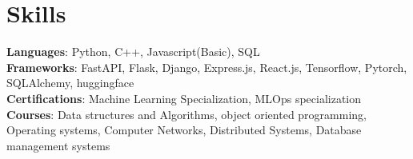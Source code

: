 \documentclass[letterpaper,11pt]{article}
\begin{document}
\section{Skills}
 \begin{itemize}[leftmargin=0.15in, label={}]
    \small{\item{
     \textbf{Languages}{: Python, C++, Javascript(Basic), SQL} \\
     \textbf{Frameworks}{: FastAPI, Flask, Django, Express.js, React.js, Tensorflow, Pytorch, SQLAlchemy, huggingface} \\
     \textbf{Certifications}{: Machine Learning Specialization, MLOps specialization} \\
     \textbf{Courses}{: Data structures and Algorithms, object oriented programming, Operating systems, Computer Networks, Distributed Systems, Database management systems}
    }}
 \end{itemize}
\end{document}
